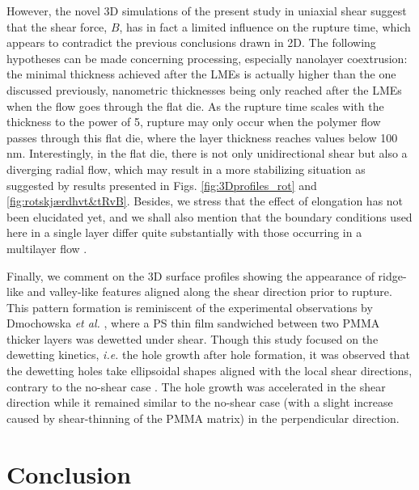 \documentclass[
 onecolumn,
 amsmath,amssymb,
floatfix,superscriptaddress
]{revtex4-2}
\begin{document}
However, the novel 3D simulations of the present study in uniaxial shear suggest that the shear force, $B$, has in fact a limited influence on the rupture time, which appears to contradict the previous conclusions drawn in 2D. The following hypotheses can be made concerning processing, especially nanolayer coextrusion: the minimal thickness achieved after the LMEs is actually higher than the one discussed previously, nanometric thicknesses being only reached after the LMEs when the flow goes through the flat die. As the rupture time scales with the thickness to the power of 5, rupture may only occur when the polymer flow passes through this flat die, where the layer thickness reaches values below 100 nm. Interestingly, in the flat die, there is not only unidirectional shear but also a diverging radial flow, which may result in a more stabilizing situation as suggested by results presented in Figs. \ref{fig:3Dprofiles_rot} and \ref{fig:rotskjærdhvt&tRvB}. Besides, we stress that the effect of elongation has not been elucidated yet, and we shall also mention that the boundary conditions used here in a single layer differ quite substantially with those occurring in a multilayer flow \cite{Lenz07}.  

Finally, we comment on the 3D surface profiles showing the appearance of ridge-like and valley-like features aligned along the shear direction prior to rupture.
This pattern formation is reminiscent of the experimental observations by Dmochowska \textit{et al.} \cite{DmochowskaMiquelard-Garnier2022}, where a PS thin film sandwiched between two PMMA thicker layers was dewetted under shear. 
Though this study focused on the dewetting kinetics, \textit{i.e.} the hole growth after hole formation, it was observed that the dewetting holes take ellipsoidal shapes aligned with the local shear directions, contrary to the no-shear case \cite{ZHUMiquelardGarnier2016,Chebil18}.
The hole growth was accelerated in the shear direction while it remained similar to the no-shear case (with a slight increase caused by shear-thinning of the PMMA matrix) in the perpendicular direction. 

\section{Conclusion}
\label{sec:conclusion}
\end{document}
